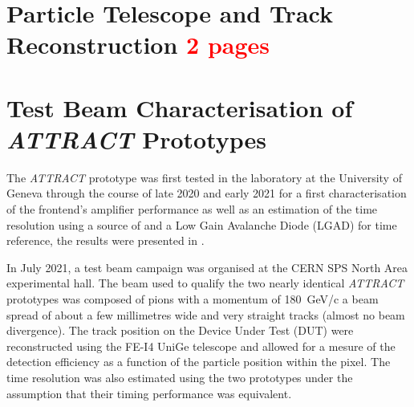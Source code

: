 %	

	\section{Particle Telescope and Track Reconstruction \textcolor{red}{ 2 pages}}

	\clearpage
	\section{Test Beam Characterisation of \textit{ATTRACT} Prototypes}
		The \textit{ATTRACT} prototype was first tested in the laboratory at the University of Geneva through the course of late 2020 and early 2021 for a first characterisation of the frontend's amplifier performance as well as an estimation of the time resolution using a source of \Sr and a Low Gain Avalanche Diode (LGAD) for time reference, the results were presented in \cite{Moretti_MasterThesis}.
		
		In July 2021, a test beam campaign was organised at the CERN SPS North Area experimental hall. The beam used to qualify the two nearly identical \textit{ATTRACT} prototypes was composed of pions with a momentum of \SI{180}{\giga\electronvolt}/c a beam spread of about a few millimetres wide and very straight tracks (almost no beam divergence). The track position on the Device Under Test (DUT) were reconstructed using the FE-I4 UniGe telescope \cite{telescope} and allowed for a mesure of the detection efficiency as a function of the particle position within the pixel. The time resolution was also estimated using the two prototypes under the assumption that their timing performance was equivalent. 
		
